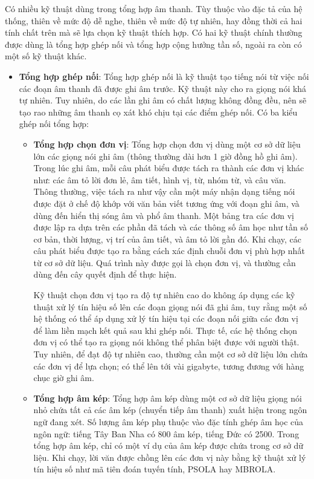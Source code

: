 \indent Có nhiều kỹ thuật dùng trong tổng hợp âm thanh. Tùy thuộc vào đặc tả của hệ thống, thiên về mức độ dễ nghe, thiên về mức độ tự nhiên, hay đồng thời cả hai tính chất trên mà sẽ lựa chọn kỹ thuật thích hợp. Có hai kỹ thuật chính thường được dùng là tổng hợp ghép nối và tổng hợp cộng hưởng tần số, ngoài ra còn có một số kỹ thuật khác.
\begin{itemize}
\item \textbf{Tổng hợp ghép nối}: Tổng hợp ghép nối là kỹ thuật tạo tiếng nói từ việc nối các đoạn âm thanh đã được ghi âm trước. Kỹ thuật này cho ra giọng nói khá tự nhiên. Tuy nhiên, do các lần ghi âm có chất lượng không đồng đều, nên sẽ tạo rao những âm thanh cọ xát khó chịu tại các điểm ghép nối. Có ba kiểu ghép nối tổng hợp:

\begin{itemize}
\item \textbf{Tổng hợp chọn đơn vị}: Tổng hợp chọn đơn vị dùng một cơ sở dữ liệu lớn các giọng nói ghi âm (thông thường dài hơn 1 giờ đồng hồ ghi âm). Trong lúc ghi âm, mỗi câu phát biểu được tách ra thành các đơn vị khác như: các âm tỏ lời đơn lẻ, âm tiết, hình vị, từ, nhóm từ, và câu văn. Thông thường, việc tách ra như vậy cần một máy nhận dạng tiếng nói được đặt ở chế độ khớp với văn bản viết tương ứng với đoạn ghi âm, và dùng đến hiển thị sóng âm và phổ âm thanh. Một bảng tra các đơn vị được lập ra dựa trên các phần đã tách và các thông số âm học như tần số cơ bản, thời lượng, vị trí của âm tiết, và âm tỏ lời gần đó. Khi chạy, các câu phát biểu được tạo ra bằng cách xác định chuỗi đơn vị phù hợp nhất từ cơ sở dữ liệu. Quá trình này được gọi là chọn đơn vị, và thường cần dùng đến cây quyết định để thực hiện.

Kỹ thuật chọn đơn vị tạo ra độ tự nhiên cao do không áp dụng các kỹ thuật xử lý tín hiệu số lên các đoạn giọng nói đã ghi âm, tuy rằng một số hệ thống có thể áp dụng xử lý tín hiệu tại các đoạn nối giữa các đơn vị để làm liền mạch kết quả sau khi ghép nối. Thực tế, các hệ thống chọn đơn vị có thể tạo ra giọng nói không thể phân biệt được với người thật. Tuy nhiên, để đạt độ tự nhiên cao, thường cần một cơ sở dữ liệu lớn chứa các đơn vị để lựa chọn; có thể lên tới vài gigabyte, tương đương với hàng chục giờ ghi âm.

\item \textbf{Tổng hợp âm kép}: Tổng hợp âm kép dùng một cơ sở dữ liệu giọng nói nhỏ chứa tất cả các âm kép (chuyển tiếp âm thanh) xuất hiện trong ngôn ngữ đang xét. Số lượng âm kép phụ thuộc vào đặc tính ghép âm học của ngôn ngữ: tiếng Tây Ban Nha có 800 âm kép, tiếng Đức có 2500. Trong tổng hợp âm kép, chỉ có một ví dụ của âm kép được chứa trong cơ sở dữ liệu. Khi chạy, lời văn được chồng lên các đơn vị này bằng kỹ thuật xử lý tín hiệu số như mã tiên đoán tuyến tính, PSOLA hay MBROLA.


\end{itemize}
\end{itemize}
